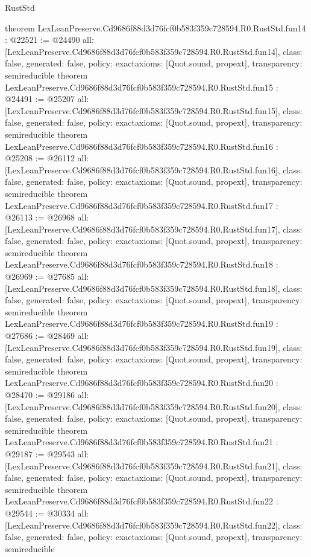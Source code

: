 \begin{lexlean}{RustStd}
\begin{coremodule}
{}
theorem LexLeanPreserve.Cd9686f88d3d76fcf0b583f359c728594.R0.RustStd.fun14 : @22521 := @24490 {
  all: [LexLeanPreserve.Cd9686f88d3d76fcf0b583f359c728594.R0.RustStd.fun14],
  class: false,
  generated: false,
  policy: exact{axioms: [Quot.sound, propext]},
  transparency: semireducible
}
theorem LexLeanPreserve.Cd9686f88d3d76fcf0b583f359c728594.R0.RustStd.fun15 : @24491 := @25207 {
  all: [LexLeanPreserve.Cd9686f88d3d76fcf0b583f359c728594.R0.RustStd.fun15],
  class: false,
  generated: false,
  policy: exact{axioms: [Quot.sound, propext]},
  transparency: semireducible
}
theorem LexLeanPreserve.Cd9686f88d3d76fcf0b583f359c728594.R0.RustStd.fun16 : @25208 := @26112 {
  all: [LexLeanPreserve.Cd9686f88d3d76fcf0b583f359c728594.R0.RustStd.fun16],
  class: false,
  generated: false,
  policy: exact{axioms: [Quot.sound, propext]},
  transparency: semireducible
}
theorem LexLeanPreserve.Cd9686f88d3d76fcf0b583f359c728594.R0.RustStd.fun17 : @26113 := @26968 {
  all: [LexLeanPreserve.Cd9686f88d3d76fcf0b583f359c728594.R0.RustStd.fun17],
  class: false,
  generated: false,
  policy: exact{axioms: [Quot.sound, propext]},
  transparency: semireducible
}
theorem LexLeanPreserve.Cd9686f88d3d76fcf0b583f359c728594.R0.RustStd.fun18 : @26969 := @27685 {
  all: [LexLeanPreserve.Cd9686f88d3d76fcf0b583f359c728594.R0.RustStd.fun18],
  class: false,
  generated: false,
  policy: exact{axioms: [Quot.sound, propext]},
  transparency: semireducible
}
theorem LexLeanPreserve.Cd9686f88d3d76fcf0b583f359c728594.R0.RustStd.fun19 : @27686 := @28469 {
  all: [LexLeanPreserve.Cd9686f88d3d76fcf0b583f359c728594.R0.RustStd.fun19],
  class: false,
  generated: false,
  policy: exact{axioms: [Quot.sound, propext]},
  transparency: semireducible
}
theorem LexLeanPreserve.Cd9686f88d3d76fcf0b583f359c728594.R0.RustStd.fun20 : @28470 := @29186 {
  all: [LexLeanPreserve.Cd9686f88d3d76fcf0b583f359c728594.R0.RustStd.fun20],
  class: false,
  generated: false,
  policy: exact{axioms: [Quot.sound, propext]},
  transparency: semireducible
}
theorem LexLeanPreserve.Cd9686f88d3d76fcf0b583f359c728594.R0.RustStd.fun21 : @29187 := @29543 {
  all: [LexLeanPreserve.Cd9686f88d3d76fcf0b583f359c728594.R0.RustStd.fun21],
  class: false,
  generated: false,
  policy: exact{axioms: [Quot.sound, propext]},
  transparency: semireducible
}
theorem LexLeanPreserve.Cd9686f88d3d76fcf0b583f359c728594.R0.RustStd.fun22 : @29544 := @30334 {
  all: [LexLeanPreserve.Cd9686f88d3d76fcf0b583f359c728594.R0.RustStd.fun22],
  class: false,
  generated: false,
  policy: exact{axioms: [Quot.sound, propext]},
  transparency: semireducible
}
\end{coremodule}
\end{lexlean}
